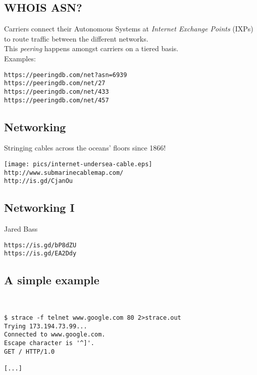 \documentclass[xga]{xdvislides}
\begin{document}
\subsection{WHOIS ASN?}
Carriers connect their Autonomous Systems at {\em
Internet Exchange Points} (IXPs) to route traffic
between the different networks.\\

This {\em peering} happens amongst carriers on a
tiered basis. \\

Examples:
\begin{verbatim}
https://peeringdb.com/net?asn=6939
https://peeringdb.com/net/27
https://peeringdb.com/net/433
https://peeringdb.com/net/457
\end{verbatim}

\subsection{Networking}
Stringing cables across the oceans' floors since 1866!
\vspace*{\fill}
\begin{center}
	\texttt{[image: pics/internet-undersea-cable.eps]} \\
	\verb+http://www.submarinecablemap.com/+ \\
	\verb+http://is.gd/CjanOu+
\end{center}
\vspace*{\fill}

\subsection{Networking I}
Jared Bass\\
\vspace{1in}

\verb+https://is.gd/bP8dZU+ \\
\verb+https://is.gd/EA2Ddy+

\subsection{A simple example}
\\
\Hugesize
\begin{center}
\begin{verbatim}
$ strace -f telnet www.google.com 80 2>strace.out
Trying 173.194.73.99...
Connected to www.google.com.
Escape character is '^]'.
GET / HTTP/1.0

[...]
\end{verbatim}
\end{center}
\Normalsize
\vspace*{\fill}
\end{document}
